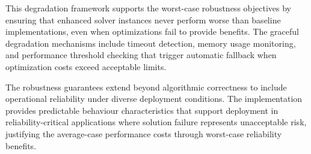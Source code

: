 This degradation framework supports the worst-case robustness objectives by ensuring that enhanced solver instances never perform worse than baseline implementations, even when optimizations fail to provide benefits. The graceful degradation mechanisms include timeout detection, memory usage monitoring, and performance threshold checking that trigger automatic fallback when optimization costs exceed acceptable limits.

The robustness guarantees extend beyond algorithmic correctness to include operational reliability under diverse deployment conditions. The implementation provides predictable behaviour characteristics that support deployment in reliability-critical applications where solution failure represents unacceptable risk, justifying the average-case performance costs through worst-case reliability benefits.